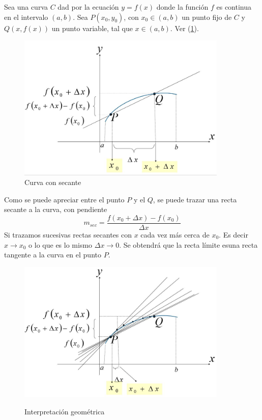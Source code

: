 \documentclass[10pt,twoside]{SelfArx} %
\begin{document}
Sea una curva $ C $ dad por la ecuación $ y=f(x) $ donde la función $ f $ es continua en el intervalo $ (a,b) $. Sea $ P(x_{0},y_{0})$,  con $ x_{0}\in(a,b) $ un punto fijo de $ C $ y $ Q(x,f(x)) $ un punto variable, tal que $ x\in(a,b) $. Ver (\ref{curva_con_secante}).\\
\begin{figure}[h]
	\centering
	\includegraphics[width=10cm]{curva_con_secante} 
	\caption{Curva con secante}
	\label{curva_con_secante}
\end{figure}

Como se puede apreciar entre el punto $ P $ y el $ Q $, se puede trazar una recta secante a la curva, con pendiente
\[ m_{sec}=\dfrac{f(x_{0}+\Delta x)-f(x_{0})}{\Delta x} \]
Si trazamos sucesivas rectas secantes con $ x $ cada vez más cerca de $ x_{0} $. Es decir $ x\rightarrow x_{0} $ o lo que es lo mismo $ \Delta x\rightarrow0 $. Se obtendr\'a que la recta límite esuna recta tangente a la curva en el punto $ P $.

\begin{figure}[h]
	\centering
	\includegraphics[width=10cm]{curvas_con_secantes}
	\label{curvas_con_secantes}
	\caption{Interpretaci\'on geom\'etrica}
\end{figure}
\end{document}
